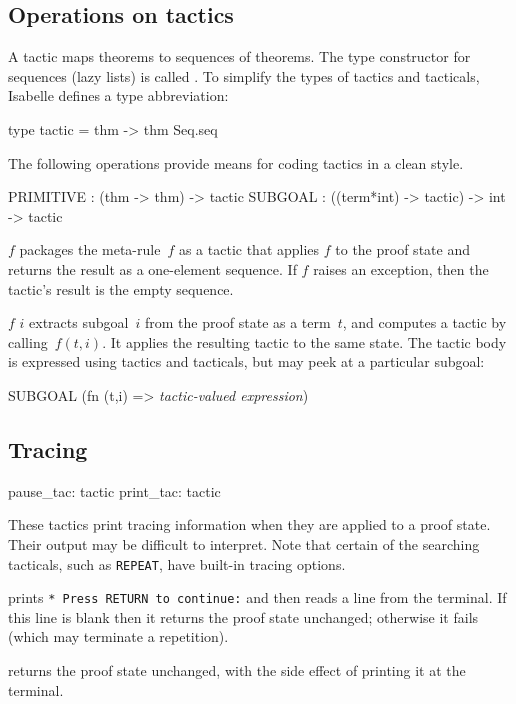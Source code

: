 \subsection{Operations on tactics}
 A tactic maps theorems to sequences of
theorems.  The type constructor for sequences (lazy lists) is called
.  To simplify the types of tactics and tacticals,
Isabelle defines a type abbreviation:
\begin{ttbox} 
type tactic = thm -> thm Seq.seq
\end{ttbox} 
The following operations provide means for coding tactics in a clean style.
\begin{ttbox} 
PRIMITIVE :                  (thm -> thm) -> tactic  
SUBGOAL   : ((term*int) -> tactic) -> int -> tactic
\end{ttbox} 
\begin{ttdescription}
\item[\ttindexbold{PRIMITIVE} $f$] packages the meta-rule~$f$ as a tactic that
  applies $f$ to the proof state and returns the result as a one-element
  sequence.  If $f$ raises an exception, then the tactic's result is the empty
  sequence.

\item[\ttindexbold{SUBGOAL} $f$ $i$] 
extracts subgoal~$i$ from the proof state as a term~$t$, and computes a
tactic by calling~$f(t,i)$.  It applies the resulting tactic to the same
state.  The tactic body is expressed using tactics and tacticals, but may
peek at a particular subgoal:
\begin{ttbox} 
SUBGOAL (fn (t,i) => {\it tactic-valued expression})
\end{ttbox} 
\end{ttdescription}


\subsection{Tracing}
\begin{ttbox} 
pause_tac: tactic
print_tac: tactic
\end{ttbox}
These tactics print tracing information when they are applied to a proof
state.  Their output may be difficult to interpret.  Note that certain of
the searching tacticals, such as {\tt REPEAT}, have built-in tracing
options.
\begin{ttdescription}
\item[\ttindexbold{pause_tac}] 
prints {\footnotesize\tt** Press RETURN to continue:} and then reads a line
from the terminal.  If this line is blank then it returns the proof state
unchanged; otherwise it fails (which may terminate a repetition).

\item[\ttindexbold{print_tac}] 
returns the proof state unchanged, with the side effect of printing it at
the terminal.
\end{ttdescription}


